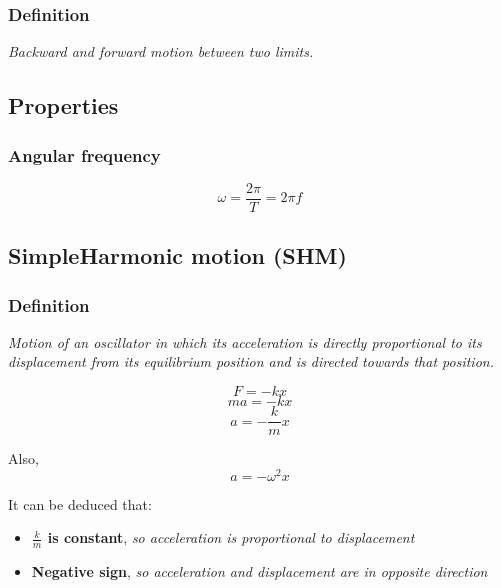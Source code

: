 \documentclass[a4paper,9pt]{scrartcl}
\begin{document}
    \subsubsection{Definition}
    \textit{Backward and forward motion between two limits.}

    \subsection{Properties}

    \subsubsection{Angular frequency}
    \begin{displaymath}
        \omega = \frac{2\pi}{T} = 2{\pi}f
    \end{displaymath}

    \subsection{SimpleHarmonic motion (SHM)}

    \subsubsection{Definition}
    \textit{Motion of an oscillator in which its acceleration is directly proportional to its displacement from its equilibrium position and is directed towards that position.}

    \begin{displaymath}
        F = -kx
    \end{displaymath}
    \begin{displaymath}
        ma = -kx
    \end{displaymath}
    \begin{displaymath}
        a = -\frac{k}{m}x
    \end{displaymath}

    Also,
    \begin{displaymath}
        a = -{{\omega}^2}x
    \end{displaymath}

    It can be deduced that:
    \begin{itemize}
        \item \textbf{$\frac{k}{m}$ is constant}, \textit{so acceleration is proportional to displacement}
        \item \textbf{Negative sign}, \textit{so acceleration and displacement are in opposite direction}
    \end{itemize}
\end{document}
